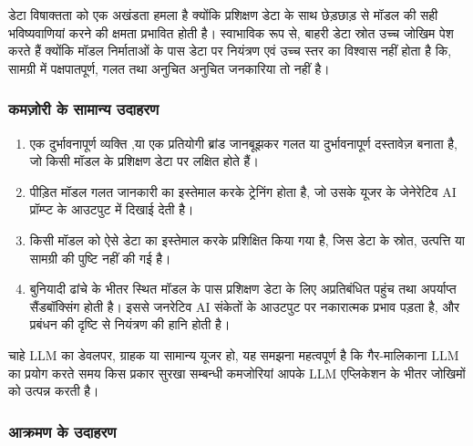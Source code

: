 \documentclass[
]{article}
\providecommand{\tightlist}{%
  \setlength{\itemsep}{0pt}\setlength{\parskip}{0pt}}
\begin{document}
डेटा विषाक्तता को एक अखंडता हमला है क्योंकि प्रशिक्षण डेटा के साथ छेड़छाड़ से मॉडल की
सही भविष्यवाणियां करने की क्षमता प्रभावित होती है। स्वाभाविक रूप से, बाहरी डेटा
स्रोत उच्च जोखिम पेश करते हैं क्योंकि मॉडल निर्माताओं के पास डेटा पर नियंत्रण एवं उच्च
स्तर का विश्वास नहीं होता है कि, सामग्री में पक्षपातपूर्ण, गलत तथा अनुचित अनुचित
जनकारिया तो नहीं है।

\subsubsection{कमज़ोरी के सामान्य
उदाहरण}\label{ux915ux92eux95bux930-ux915-ux938ux92eux928ux92f-ux909ux926ux939ux930ux923}

\begin{enumerate}
\def\labelenumi{\arabic{enumi}.}
\tightlist
\item
  एक दुर्भावनापूर्ण व्यक्ति ,या एक प्रतियोगी ब्रांड जानबूझकर गलत या दुर्भावनापूर्ण
  दस्तावेज़ बनाता है, जो किसी मॉडल के प्रशिक्षण डेटा पर लक्षित होते हैं।
\item
  पीड़ित मॉडल गलत जानकारी का इस्तेमाल करके ट्रेनिंग होता है, जो उसके यूजर के जेनेरेटिव
  AI प्रॉम्प्ट के आउटपुट में दिखाई देती है।
\item
  किसी मॉडल को ऐसे डेटा का इस्तेमाल करके प्रशिक्षित किया गया है, जिस डेटा के स्रोत,
  उत्पत्ति या सामग्री की पुष्टि नहीं की गई है।
\item
  बुनियादी ढांचे के भीतर स्थित मॉडल के पास प्रशिक्षण डेटा के लिए अप्रतिबंधित पहुंच तथा
  अपर्याप्त सैंडबॉक्सिंग होती है। इससे जनरेटिव AI संकेतों के आउटपुट पर नकारात्मक प्रभाव
  पड़ता है, और प्रबंधन की दृष्टि से नियंत्रण की हानि होती है।
\end{enumerate}

चाहे LLM का डेवलपर, ग्राहक या सामान्य यूजर हो, यह समझना महत्वपूर्ण है कि
गैर-मालिकाना LLM का प्रयोग करते समय किस प्रकार सुरखा सम्बन्धी कमजोरियां आपके LLM
एप्लिकेशन के भीतर जोखिमों को उत्पन्न करती है।

\subsubsection{आक्रमण के
उदाहरण}\label{ux906ux915ux930ux92eux923-ux915-ux909ux926ux939ux930ux923}
\end{document}
